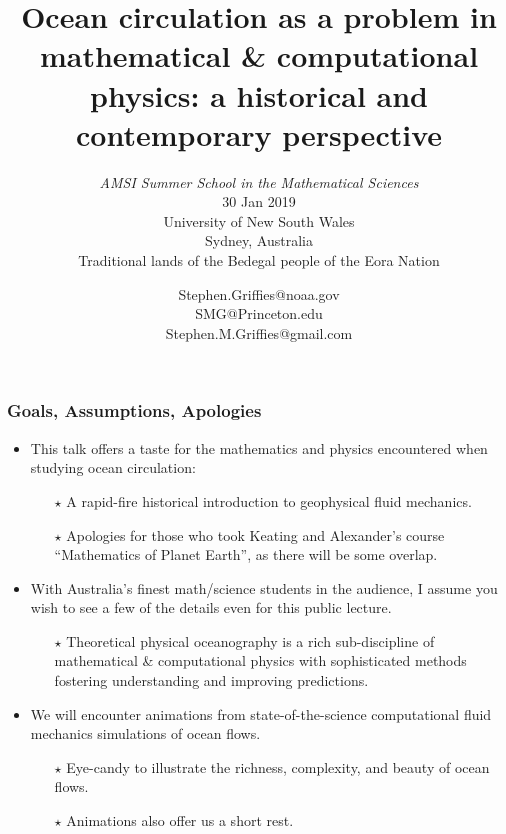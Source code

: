 \documentclass[10pt]{beamer}
\title[Ocean circulation]{Ocean circulation
  as a problem in mathematical \& computational physics:  a historical
  and contemporary  perspective} %
\subtitle{ {\it AMSI Summer School in the Mathematical Sciences} \\
  30 Jan 2019 \\ \vspace{.25cm}
  University of New South Wales \\
 Sydney, Australia  \\ Traditional lands of the Bedegal people of the Eora Nation
}
\author[{\sc Stephen.M.Griffies@gmail.com}] %
{ {\sc Stephen.Griffies@noaa.gov  \\ SMG@Princeton.edu \\  Stephen.M.Griffies@gmail.com 
} 
}
\institute[NOA/GFDL + Princeton University]{NOAA/GFDL + Princeton University}
\date{}
\begin{document}
  
\begin{frame}
  \titlepage
\end{frame}


\begin{frame}
  \frametitle{Goals, Assumptions, Apologies}


\begin{exampleblock}{}
\begin{itemize}

\item This talk offers a taste for the mathematics and physics
  encountered when studying ocean circulation:
  \begin{itemize}
    \item[$\star$] A rapid-fire historical introduction to geophysical fluid mechanics.  
    \item[$\star$] Apologies for those who took Keating and
      Alexander's course ``Mathematics of Planet Earth'', as there
      will be some overlap.
  \end{itemize}

\item With Australia's finest math/science students in the audience, I
  assume you wish to see a few of the details even for this public lecture. 
  \begin{itemize}
  \item[$\star$] Theoretical physical oceanography is a rich
    sub-discipline of mathematical \& computational physics with
    sophisticated methods fostering understanding and improving
    predictions.
  \end{itemize}

\item We will encounter animations from state-of-the-science computational
  fluid mechanics simulations of ocean flows.
  \begin{itemize}
  \item[$\star$] Eye-candy to illustrate the richness, complexity, and
    beauty of ocean flows.  
  \item[$\star$] Animations also offer us a short rest.
  \end{itemize}

\end{itemize}
\end{exampleblock}{}

\end{frame}
\end{document}
